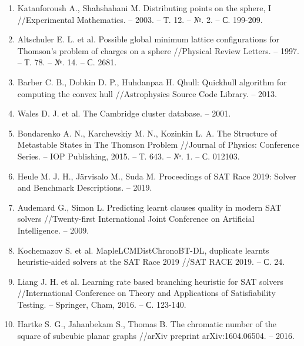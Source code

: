 \begin{enumerate}[leftmargin=0.5cm,topsep=0pt,itemsep=-1ex,partopsep=1ex,parsep=1ex,ref=\arabic{*},label=\arabic{*}.]
\item\label{bib:Katanforoush}
Katanforoush A., Shahshahani M. Distributing points on the sphere, I //Ex\-pe\-ri\-men\-tal Mathematics. – 2003. – Т. 12. – №. 2. – С. 199-209.

\item\label{bib:Altschuler}
Altschuler E. L. et al. Possible global minimum lattice configurations for Thomson's problem of charges on a sphere //Physical Review Letters. – 1997. – Т. 78. – №. 14. – С. 2681.

\item\label{bib:Barber}
Barber C. B., Dobkin D. P., Huhdanpaa H. Qhull: Quickhull algorithm for computing the convex hull //Astrophysics Source Code Library. – 2013.

\item\label{bib:Wales}
Wales D. J. et al. The Cambridge cluster database. – 2001.

\item\label{bib:Bondarenko}
Bondarenko A. N., Karchevskiy M. N., Kozinkin L. A. The Structure of Metastable States in The Thomson Problem //Journal of Physics: Conference Series. – IOP Publishing, 2015. – Т. 643. – №. 1. – С. 012103.

\item\label{bib:HeuleSATRace2019}
Heule M. J. H., Järvisalo M., Suda M. Proceedings of SAT Race 2019: Solver and Benchmark Descriptions. – 2019.

\item\label{bib:Audemard}
Audemard G., Simon L. Predicting learnt clauses quality in modern SAT solvers //Twenty-first International Joint Conference on Artificial Intelligence. – 2009.

\item\label{bib:Kochemazov}
Kochemazov S. et al. MapleLCMDistChronoBT-DL, duplicate learnts heuris\-tic-aided solvers at the SAT Race 2019 //SAT RACE 2019. – С. 24.

\item\label{bib:Liang}
Liang J. H. et al. Learning rate based branching heuristic for SAT solvers //International Conference on Theory and Applications of Satisfiability Tes\-ting. – Springer, Cham, 2016. – С. 123-140.

\item\label{bib:Hartke}
Hartke S. G., Jahanbekam S., Thomas B. The chromatic number of the square of subcubic planar graphs //arXiv preprint arXiv:1604.06504. – 2016.

\end{enumerate}

